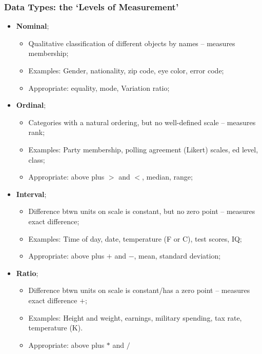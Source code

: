 \documentclass[aspectratio=169]{beamer}
\theoremstyle{principle}
\begin{document}
\begin{frame}
\frametitle{Data Types: the `Levels of Measurement'} 
\begin{itemize}
\item \textbf{Nominal};
\begin{itemize}
\item Qualitative classification of different objects by names -- measures membership;
\item Examples: Gender, nationality, zip code, eye color, error code;
\item Appropriate: equality, mode, Variation ratio;
\end{itemize}
\item \textbf{Ordinal};
\begin{itemize}
\item Categories with a natural ordering, but no well-defined scale -- measures rank;
\item Examples: Party membership, polling agreement (Likert) scales, ed level, class;
\item Appropriate: above plus $>$ and $<$, median, range;
\end{itemize}
\item \textbf{Interval};
\begin{itemize}
\item Difference btwn units on scale is constant, but no zero point -- measures exact difference;
\item Examples: Time of day, date, temperature (F or C), test scores, IQ;
\item Appropriate: above plus $+$ and $-$, mean, standard deviation;
\end{itemize}
\item \textbf{Ratio};
\begin{itemize}
\item Difference btwn units on scale is constant/has a zero point -- measures exact difference $+$;
\item Examples: Height and weight, earnings, military spending, tax rate, temperature (K).
\item Appropriate: above plus $*$ and $/$
\end{itemize}
\end{itemize}
\end{frame}
\end{document}
